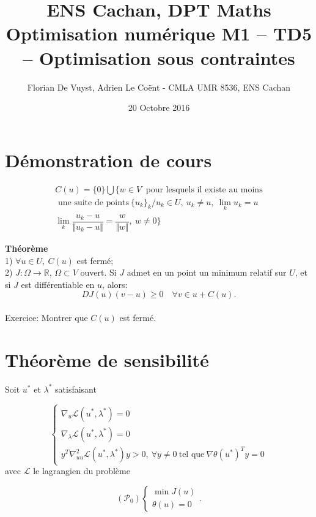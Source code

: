 \documentclass[11pt, a4paper]{article}
\title{ENS Cachan, DPT Maths \\ [1cm]
Optimisation numérique M1 -- TD5 -- Optimisation sous contraintes}
\author{Florian De Vuyst, Adrien Le Co\"ent - CMLA UMR 8536, ENS Cachan}
\date{20 Octobre 2016}
\begin{document}
%
\maketitle

\section*{Démonstration de cours}

\begin{multline*}
 C(u)= \{0 \} \bigcup \{ w \in V   ~ \text{ pour lesquels il existe au moins} \\ \text{ une suite de points} ~ \{u_k\}_k
 / u_k \in U,~ u_k \neq u, ~ \lim_k u_k = u \\
 \lim_k \dfrac{u_k - u}{\Vert u_k - u \Vert} = \dfrac{w}{\Vert w \Vert}, ~ w \neq 0 \}
\end{multline*}

{\bf Théorème}\\
 1) $\forall u \in U, ~C(u)$ est fermé; \\
 2) $J: \Omega \longrightarrow \mathbb{R}$, $\Omega \subset V$ ouvert. Si $J$ admet en un point 
 un minimum relatif sur $U$, et si $J$ est différentiable en $u$, alors:
 $$ DJ(u)(v-u) \geq 0 \quad \forall v \in u + C(u). $$ \\

Exercice: Montrer que $C(u)$ est fermé.


%
\section*{Théorème de sensibilité}
%
Soit $u^*$ et $\lambda^*$ satisfaisant

\begin{equation}
\left\lbrace
\begin{array}{c}
\nabla_u \mathcal{L} (u^*, \lambda^*) = 0\\
\nabla_{\lambda} \mathcal{L} (u^*, \lambda^*) = 0\\
y^T \nabla^2_{uu}\mathcal{L}(u^*, \lambda^*)y >0, ~\forall y\neq0 ~ \text{tel que} ~ \nabla \theta(u^*)^Ty = 0
\end{array}
\right.
\end{equation}
avec $\mathcal{L}$ le lagrangien du problème

\begin{equation*}
(\mathcal{P}_0)
\left\lbrace
\begin{array}{c}
\min J(u)\\
\theta (u) = 0
\end{array}
\right. .
\end{equation*}
\end{document}
